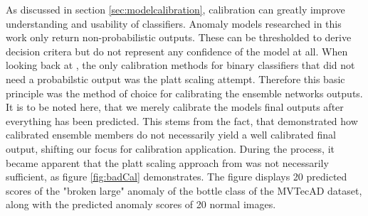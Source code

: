 As discussed in section \ref{sec:modelcalibration}, calibration can greatly improve understanding and usability of classifiers. Anomaly models researched in this work only return non-probabilistic 
outputs. These can be thresholded to derive decision critera but do not represent any confidence of the model at all. When looking back at \cite{Guo_2017_tempscalingetc}, the only calibration 
methods for binary classifiers that did not need a probabilstic output was the platt scaling attempt. Therefore this basic principle was the method of choice for calibrating the ensemble networks 
outputs. It is to be noted here, that we merely calibrate the models final outputs after everything has been predicted. This stems from the fact, that \cite{Wu_2021_shouldbecalibrated} demonstrated 
how calibrated ensemble members do not necessarily yield a well calibrated final output, shifting our focus for calibration application. During the process, it became apparent that the platt 
scaling approach from \cite{Guo_2017_tempscalingetc} was not necessarily sufficient, as figure \ref{fig:badCal} demonstrates. The figure displays 20 predicted scores of the "broken large" anomaly of the bottle class of the MVTecAD dataset, 
along with the predicted anomaly scores of 20 normal images.

